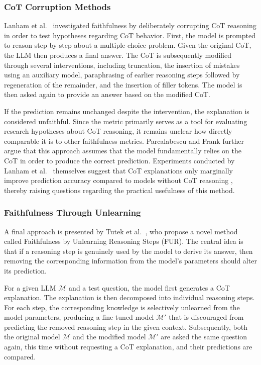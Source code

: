 \subsubsection{CoT Corruption Methods}
Lanham et al.~\cite{lanhamMeasuringFaithfulnessChainofThought2023} investigated faithfulness by deliberately corrupting CoT reasoning in order to test hypotheses regarding CoT behavior. First, the model is prompted to reason step-by-step about a multiple-choice problem. Given the original CoT, the LLM then produces a final answer. The CoT is subsequently modified through several interventions, including truncation, the insertion of mistakes using an auxiliary model, paraphrasing of earlier reasoning steps followed by regeneration of the remainder, and the insertion of filler tokens. The model is then asked again to provide an answer based on the modified CoT.

If the prediction remains unchanged despite the intervention, the explanation is considered unfaithful. Since the metric primarily serves as a tool for evaluating research hypotheses about CoT reasoning, it remains unclear how directly comparable it is to other faithfulness metrics. Parcalabescu and Frank \cite{parcalabescuMeasuringFaithfulnessSelfconsistency2024} further argue that this approach assumes that the model fundamentally relies on the CoT in order to produce the correct prediction. Experiments conducted by Lanham et al.~\cite{lanhamMeasuringFaithfulnessChainofThought2023} themselves suggest that CoT explanations only marginally improve prediction accuracy compared to models without CoT reasoning \cite{parcalabescuMeasuringFaithfulnessSelfconsistency2024}, thereby raising questions regarding the practical usefulness of this method.

\subsubsection{Faithfulness Through Unlearning}
A final approach is presented by Tutek et al.~\cite{tutekMeasuringChainThought2025}, who propose a novel method called Faithfulness by Unlearning Reasoning Steps (FUR). The central idea is that if a reasoning step is genuinely used by the model to derive its answer, then removing the corresponding information from the model’s parameters should alter its prediction.

For a given LLM $\mathcal{M}$ and a test question, the model first generates a CoT explanation. The explanation is then decomposed into individual reasoning steps. For each step, the corresponding knowledge is selectively unlearned from the model parameters, producing a fine-tuned model $\mathcal{M}'$ that is discouraged from predicting the removed reasoning step in the given context. Subsequently, both the original model $\mathcal{M}$ and the modified model $\mathcal{M}'$ are asked the same question again, this time without requesting a CoT explanation, and their predictions are compared.

